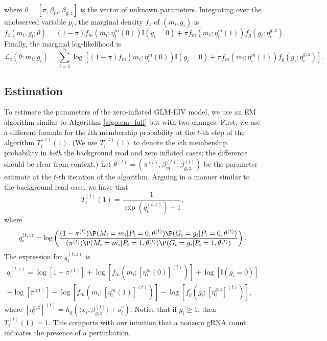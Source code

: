 \documentclass[12pt]{article}
\begin{document}
\begin{appendices}
\begin{multline*}
\end{multline*}
where $\theta = [\pi, \beta_m, \beta_{g,z}]$ is the vector of unknown parameters.
Integrating over the unobserved variable $p_i$, the marginal density $f_z$ of $(m_i, g_i)$ is
$$f_z(m_i, g_i; \theta) = (1-\pi) f_m(m_i;\eta^m_i(0)) \mathbb{I}(g_i = 0) + \pi f_m(m_i; \eta^m_i(1)) f_g(g_i;\eta^{g,z}_i).$$ Finally, the marginal log-likelihood is
$$
\mathcal{L}_z(\theta; m_i, g_i) = \sum_{i=1}^n \log\left[ (1-\pi) f_m(m_i;\eta^m_i(0)) \mathbb{I}(g_i = 0) + \pi f_m(m_i; \eta^m_i(1)) f_g(g_i;\eta^{g,z}_i) \right].
$$

\subsection{Estimation}
To estimate the parameters of the zero-inflated GLM-EIV model, we use an EM algorithm similar to Algorithm \ref{algo:em_full} but with two changes. First, we use a different formula for the $i$th membership probability at the $t$-th step of the algorithm $T^{(t)}_i(1)$. (We use $T^{(t)}_i(1)$ to denote the $i$th membership probability in \textit{both} the background read and zero inflated cases; the difference should be clear from context.) Let $\theta^{(t)} = (\pi^{(t)}, \beta^{(t)}_m, \beta^{(t)}_{g,z})$ be the parameter estimate at the $t$-th iteration of the algorithm. Arguing in a manner similar to the background read case, we have that $$T^{(t)}_i(1) = \frac{1}{ \exp(q_i^{\left(t,z\right)}) + 1},$$ where
$$q_i^{(t,z)} = \log \left(\frac{(1 - \pi^{(t)}) \P(M_i = m_i | P_i = 0, \theta^{(t)}) \P(G_i = g_i | P_i = 0, \theta^{(t)})}{(\pi^{(t)}) \P(M_i = m_i | P_i = 1, \theta^{(t)}) \P(G_i = g_i | P_i = 1, \theta^{(t)})}\right).$$
The expression for $q^{(t,z)}_i$ is
\begin{multline*}
q^{(t,z)}_i = \log\left[ 1 - \pi^{(t)} \right] + \log\left[ f_m\left(m_i; \left[ \eta^m_i(0) \right]^{(t)}\right) \right] + \log\left[ \mathbb{I}(g_i = 0) \right] \\ - \log\left[ \pi^{(t)} \right] - \log\left[ f_m\left(m_i; \left[ \eta^m_i(1) \right]^{(t)}\right) \right] - \log\left[ f_g\left(g_i; \left[\eta^{g,z}_i \right]^{(t)}\right) \right],
\end{multline*}
where $[\eta^{g,z}_i]^{(t)} = h_g( \langle x_i, \beta^{(t)}_{g,z} \rangle + o^g_i).$ Notice that if $g_i \geq 1$, then $T^{(t)}_i(1) = 1.$ This comports with our intuition that a nonzero gRNA count indicates the presence of a perturbation.


\end{appendices}
\end{document}
